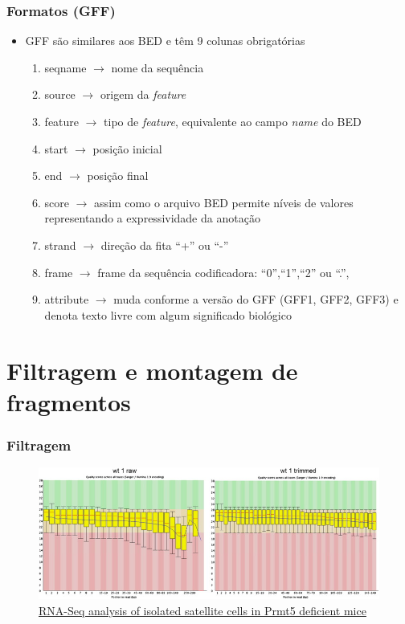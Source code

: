 \documentclass{beamer}
\begin{document}
	\begin{frame}\frametitle{Formatos (GFF)}
		\begin{itemize}
		\item GFF são similares aos BED e têm 9 colunas obrigatórias
		\begin{enumerate}
		\item seqname $\rightarrow$ nome da sequência
		\item source $\rightarrow$ origem da \textit{feature}
		\item feature $\rightarrow$ tipo de \textit{feature}, equivalente ao campo \textit{name} do BED
		\item start $\rightarrow$ posição inicial
		\item end $\rightarrow$ posição final
		\item score $\rightarrow$ assim como o arquivo BED permite níveis de valores representando a expressividade da anotação
		\item strand $\rightarrow$ direção da fita ``+'' ou ``-''
		\item frame $\rightarrow$ frame da sequência codificadora: ``0'',``1'',``2'' ou ``.'',
		\item attribute $\rightarrow$ muda conforme a versão do GFF (GFF1, GFF2, GFF3) e denota texto livre com algum significado biológico
		\end{enumerate}
		\end{itemize}
	\end{frame}

	\section{Filtragem e montagem de fragmentos}
	
		\begin{frame}\frametitle{Filtragem}
		\begin{figure}[ht]
			\centering
			\includegraphics[scale=0.6]{img/filtragem.png}
			\caption{\tiny{\href{http://dx.doi.org/10.1016/j.gdata.2015.05.013}{RNA-Seq analysis of isolated satellite cells in Prmt5 deficient mice}}}
		\end{figure}
		\end{frame}
	
\end{document}
